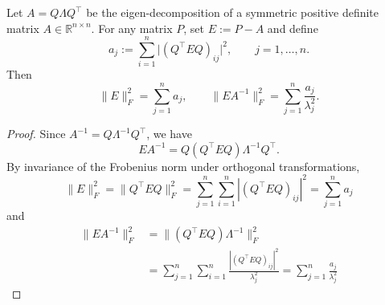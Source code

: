\documentclass[10pt,a4paper]{amsart}
\begin{document}
\begin{lemma}\label{lem:spectral-objectives}
Let $A = Q \Lambda Q^\top$ be the eigen-decomposition of a symmetric positive definite matrix 
$A \in \mathbb{R}^{n \times n}$.%
For any matrix $P$, set $E := P - A$ and define
\begin{equation*}
a_j := \sum_{i=1}^n \big|(Q^\top E Q)_{ij}\big|^2, \qquad j=1,\dots,n.
\end{equation*}
Then
\begin{equation*}
\|E\|_F^2 = \sum_{j=1}^n a_j,
\qquad
\|E A^{-1}\|_F^2 = \sum_{j=1}^n \frac{a_j}{\lambda_j^2}.
\end{equation*}
\end{lemma}

\begin{proof}
Since $A^{-1} = Q \Lambda^{-1} Q^\top$, we have
\begin{equation*}
E A^{-1} = Q (Q^\top E Q) \Lambda^{-1} Q^\top.
\end{equation*}
By invariance of the Frobenius norm under orthogonal transformations,
\begin{equation*}
\|E\|_F^2 = \|Q^\top E Q\|_F^2 = \sum_{j=1}^n \sum_{i=1}^n |(Q^\top E Q)_{ij}|^2 = \sum_{j=1}^n a_j
\end{equation*}
and
\begin{align*}
\|E A^{-1}\|_F^2 &= \|(Q^\top E Q)\Lambda^{-1}\|_F^2 \nonumber \\
&= \sum_{j=1}^n \sum_{i=1}^n \frac{|(Q^\top E Q)_{ij}|^2}{\lambda_j^2} = \sum_{j=1}^n \frac{a_j}{\lambda_j^2}
\end{align*}
\end{proof}
\end{document}
